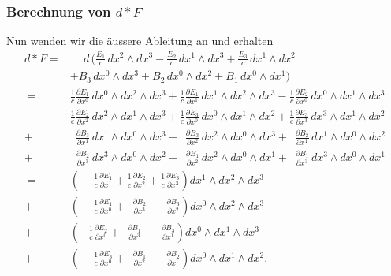 \subsubsection{Berechnung von $d {\ast} F$}
Nun wenden wir die äussere Ableitung an und erhalten
\begin{align*}
	d{\ast} F
	= &\phantom{+} d \, \Bigg(
	\frac{E_{1}}{c} \, dx^2 \wedge dx^3
	- \frac{E_{2}}{c} \, dx^1 \wedge dx^3
	+ \frac{E_{3}}{c} \, dx^1 \wedge dx^2 
	\\
	&+ B_3 \, dx^0 \wedge dx^3
	+ B_2 \, dx^0 \wedge dx^2
	+ B_1 \, dx^0 \wedge dx^1
	\Bigg) \\[1ex]
	= \phantom{+} &\frac{1}{c} \frac{\partial E_1}{\partial x^0} \, dx^0 \wedge dx^2 \wedge dx^3
	+ \frac{1}{c} \frac{\partial E_1}{\partial x^1} \, dx^1 \wedge dx^2 \wedge dx^3
	- \frac{1}{c} \frac{\partial E_2}{\partial x^0} \, dx^0 \wedge dx^1 \wedge dx^3 
	\\
	- &\frac{1}{c} \frac{\partial E_2}{\partial x^2} \, dx^2 \wedge dx^1 \wedge dx^3
	+ \frac{1}{c} \frac{\partial E_3}{\partial x^0} \, dx^0 \wedge dx^1 \wedge dx^2
	+ \frac{1}{c} \frac{\partial E_3}{\partial x^3} \, dx^3 \wedge dx^1 \wedge dx^2 
	\\
	+&\phantom{\frac{1}{c}} \frac{\partial B_3}{\partial x^1} \, dx^1 \wedge dx^0 \wedge dx^3
	+ \phantom{\frac{1}{c}} \frac{\partial B_3}{\partial x^2} \, dx^2 \wedge dx^0 \wedge dx^3
	+ \phantom{\frac{1}{c}} \frac{\partial B_2}{\partial x^1} \, dx^1 \wedge dx^0 \wedge dx^2 \\
	+&\phantom{\frac{1}{c}} \frac{\partial B_2}{\partial x^3} \, dx^3 \wedge dx^0 \wedge dx^2
	+ \phantom{\frac{1}{c}} \frac{\partial B_1}{\partial x^2} \, dx^2 \wedge dx^0 \wedge dx^1
	+ \phantom{\frac{1}{c}} \frac{\partial B_1}{\partial x^3} \, dx^3 \wedge dx^0 \wedge dx^1 
	\\[2ex]
	= \phantom{+} &\left(
	\phantom{+} \frac{1}{c} \frac{\partial E_1}{\partial x^1}
	+ \frac{1}{c} \frac{\partial E_2}{\partial x^2}
	+ \frac{1}{c} \frac{\partial E_3}{\partial x^3}
	\right) dx^1 \wedge dx^2 \wedge dx^3 
	\\
	+ &\left(
	\phantom{+} \frac{1}{c} \frac{\partial E_1}{\partial x^0}
	+ \phantom{\frac{1}{c}} \frac{\partial B_2}{\partial x^3}
	- \phantom{\frac{1}{c}} \frac{\partial B_3}{\partial x^2}
	\right) dx^0 \wedge dx^2 \wedge dx^3 
	\\
	+ &\left(
	-\frac{1}{c} \frac{\partial E_2}{\partial x^0}
	+ \phantom{\frac{1}{c}} \frac{\partial B_1}{\partial x^3}
	- \phantom{\frac{1}{c}} \frac{\partial B_3}{\partial x^1}
	\right) dx^0 \wedge dx^1 \wedge dx^3 
	\\
	+ &\left(
	\phantom{+} \frac{1}{c} \frac{\partial E_3}{\partial x^0}
	+ \phantom{\frac{1}{c}} \frac{\partial B_1}{\partial x^2}
	- \phantom{\frac{1}{c}} \frac{\partial B_2}{\partial x^1}
	\right) dx^0 \wedge dx^1 \wedge dx^2.
\end{align*}
